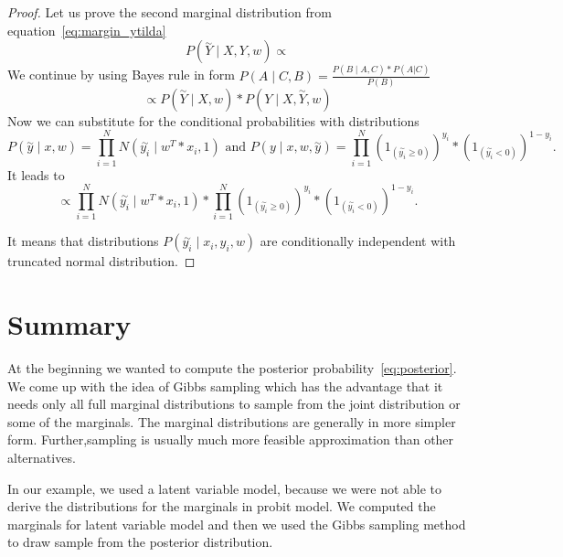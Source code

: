 \begin{proof}
Let us prove the second marginal distribution from equation~\ref{eq:margin_ytilda} 
\begin{equation}
P(\overset{\sim}{Y} \mid X, Y, w) \propto
\end{equation}
We continue by using Bayes rule in form $ P(A \mid C, B) = \frac{P( B \mid A, C) * P(A|C)}{P(B)}$ 
\begin{equation}
    \propto P(\overset{\sim}{Y} \mid X, w) * P(Y \mid X,\overset{\sim}{Y}, w)
\end{equation}
Now we can substitute for the conditional probabilities with distributions
\begin{equation}
    P(\overset{\sim}{y} \mid x,w) = \prod_{i=1}^{N}N(\overset{\sim}{y_i} \mid w^T*x_i, 1) \text{ and } 
    P(y \mid x,w,\overset{\sim}{y}) = \prod_{i=1}^{N}{(1_{(\overset{\sim}{y_i} \ge 0)})}^{y_i} * {(1_{(\overset{\sim}{y_i} < 0)})}^{1-y_i}.
\end{equation}
It leads to
\begin{equation}
    \propto \prod_{i=1}^{N}N(\overset{\sim}{y_i} \mid w^T*x_i, 1) * 
    \prod_{i=1}^{N}{(1_{(\overset{\sim}{y_i} \ge 0)})}^{y_i} * {(1_{(\overset{\sim}{y_i} < 0)})}^{1-y_i}.
\end{equation}

It means that distributions $ P(\overset{\sim}{y_i} \mid  x_i, y_i, w) $ are conditionally independent with truncated normal distribution.
\end{proof}


\section{Summary} 
\label{sec:summary}
At the beginning we wanted to compute the posterior probability~\ref{eq:posterior}.
We come up with the idea of Gibbs sampling which has the advantage that it needs only all
full marginal distributions to sample from the joint distribution or some of the marginals.
The marginal distributions are generally in more simpler form. Further,sampling is usually much more
feasible approximation than other alternatives. 

In our example, we used a latent variable model, because we were not able to derive the distributions for the marginals in probit model.
We computed the marginals for latent variable model and then we used the Gibbs sampling method
to draw sample from the posterior distribution.


